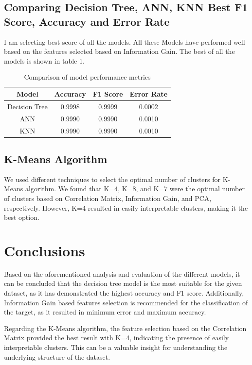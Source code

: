 \documentclass{article}
\begin{document}
\subsection{Comparing Decision Tree, ANN, KNN Best F1 Score, Accuracy and Error Rate}
I am selecting best score of all the models. All these Models have performed well based on the features selected based on Information Gain. The best of all the models is shown in table 1.

\begin{table}[h]
\centering
\begin{tabular}{|c|c|c|c|}
\hline
\textbf{Model} & \textbf{Accuracy} & \textbf{F1 Score} & \textbf{Error Rate} \\ \hline
Decision Tree & 0.9998 & 0.9999 & 0.0002 \\ \hline
ANN & 0.9990 & 0.9990 & 0.0010 \\ \hline
KNN & 0.9990 & 0.9990 & 0.0010 \\ \hline
\end{tabular}
\caption{Comparison of model performance metrics}
\label{tab:model_performance}
\end{table}

\subsection{K-Means Algorithm}
We used different techniques to select the optimal number of clusters for K-Means algorithm. We found that K=4, K=8, and K=7 were the optimal number of clusters based on Correlation Matrix, Information Gain, and PCA, respectively.
However, K=4 resulted in easily interpretable clusters, making it the best option.





\section{Conclusions}
Based on the aforementioned analysis and evaluation of the different models, it can be concluded that the decision tree model is the most suitable for the given dataset, as it has demonstrated the highest accuracy and F1 score. Additionally, Information Gain based features selection is recommended for the classification of the target, as it resulted in minimum error and maximum accuracy.

Regarding the K-Means algorithm, the feature selection based on the Correlation Matrix provided the best result with K=4, indicating the presence of easily interpretable clusters. This can be a valuable insight for understanding the underlying structure of the dataset.
\end{document}
